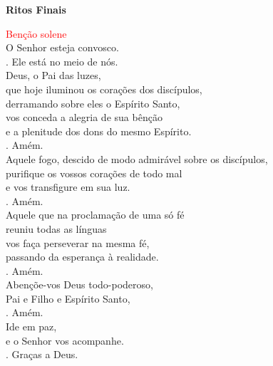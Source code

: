 \documentclass{book}
\begin{document}
\begin{center}

    \textbf{Ritos Finais}

\end{center}

\begin{flushleft}
    \textcolor{red}{Benção solene}
    \vspace{.1cm} \\
    O Senhor esteja convosco.
    \vspace{.1cm} \\
    {\color{red} \Rbar.} Ele está no meio de nós.
    \vspace{.1cm} \\
    Deus, o Pai das luzes, \\
    que hoje iluminou os corações dos discípulos, \\
    derramando sobre eles o Espírito Santo, \\
    vos conceda a alegria de sua bênção \\
    e a plenitude dos dons do mesmo Espírito.
    \vspace{.1cm} \\
    {\color{red} \Rbar.} Amém.
    \vspace{.1cm} \\
    Aquele fogo, descido de modo admirável sobre os discípulos, \\
    purifique os vossos corações de todo mal \\
    e vos transfigure em sua luz.
    \vspace{.1cm} \\
    {\color{red} \Rbar.} Amém.
    \vspace{.1cm} \\
    Aquele que na proclamação de uma só fé \\
    reuniu todas as línguas \\
    vos faça perseverar na mesma fé, \\
    passando da esperança à realidade.
    \vspace{.1cm} \\
    {\color{red} \Rbar.} Amém.
    \vspace{.1cm} \\
    Abençõe-vos Deus todo-poderoso, \\
    Pai e Filho e Espírito Santo,
    \vspace{.1cm} \\
    {\color{red} \Rbar.} Amém.
    \vspace{.1cm} \\
    Ide em paz, \\
    e o Senhor vos acompanhe.
    \vspace{.1cm} \\
    {\color{red} \Rbar.} Graças a Deus.

\end{flushleft}
\end{document}

